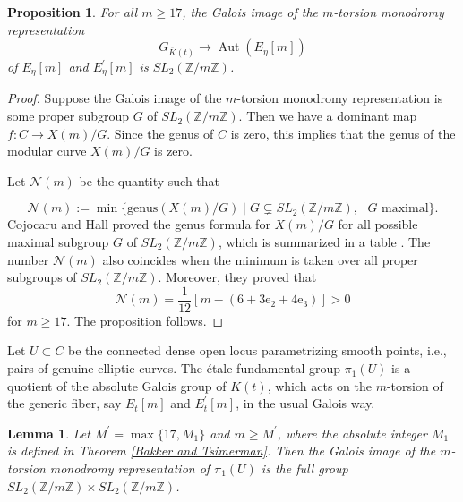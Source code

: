 \documentclass[12pt]{amsart}
\newtheorem{prop}[thm]{Proposition}
\newtheorem{lem}[thm]{Lemma}
\theoremstyle{definition}
\theoremstyle{remark}
\numberwithin{equation}{section}
\newcommand{\Z}{\mathbb{Z}}
\newcommand{\Aut}{\operatorname{Aut}}
\begin{document}
 \begin{prop}\label{choice of m}
	For all $m \ge 17$, the Galois image of the $m$-torsion monodromy representation
$$G_{\overline{K}(t)}\rightarrow \Aut(E_\eta[m])$$
    of $E_{\eta}[m]$ and $E^{\prime}_{\eta}[m]$ is $SL_{2}(\Z/m\Z)$.
\end{prop}
\begin{proof}
	Suppose the Galois image of the $m$-torsion monodromy representation is some proper subgroup $G$ of $SL_{2}(\Z/m\Z)$. Then we have a dominant map $f: C \to X(m)/G$. Since the genus of $C$ is zero, this implies that the genus of the modular curve $X(m)/G$ is zero. 
	
	Let $\mathcal{N}(m)$ be the quantity such that
	
	$$\mathcal{N}(m):= \operatorname{min} \{ \text{genus}(X(m)/G) \mid G \subsetneq SL_{2}(\Z/m\Z),\text{ } G \text{ maximal}\}.$$
	Cojocaru and Hall proved the genus formula for $X(m)/G$ for all possible maximal subgroup $G$ of $SL_{2}(\Z/m\Z)$, which is summarized in a table \cite[Table 2.1]{CH05}. The number $\mathcal{N}(m)$ also coincides when the minimum is taken over all proper subgroups of $SL_2(\mathbb{Z}/m\mathbb{Z})$. Moreover, they proved that 
	$$\mathcal{N}(m)=\frac{1}{12}\left[m-\left(6+3 \mathrm{e}_2+4 \mathrm{e}_3\right)\right]>0$$
	for $m \ge 17$. The proposition follows.
\end{proof}

 Let $U \subset C$ be the connected dense open locus parametrizing smooth points, i.e., pairs of genuine elliptic curves. The \'etale fundamental group $\pi_{1}(U)$ is a quotient of the absolute Galois group of $K(t)$, which acts on the $m$-torsion of the generic fiber, say $E_{t}[m]$ and $E^{\prime}_{t}[m]$, in the usual Galois way.

\begin{lem}\label{full monodromy} 
 Let $M^{\prime}=\max\{17,M_1\}$ and $m \ge M^{\prime}$, where the absolute integer $M_1$ is defined in Theorem \ref{Bakker and Tsimerman}. Then the Galois image of the $m$-torsion monodromy representation of $\pi_{1}(U)$ is the full group $SL_{2}(\Z/m\Z) \times SL_{2}(\Z/m\Z)$.
  \end{lem}
\end{document}
